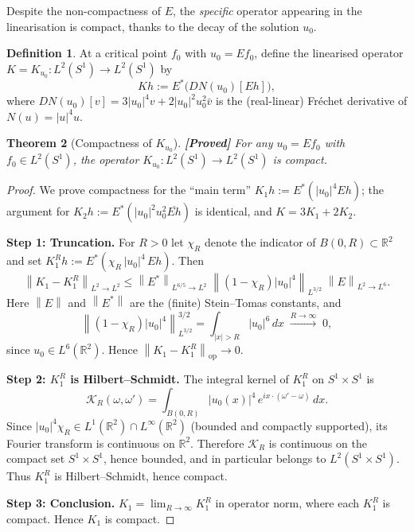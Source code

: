 \documentclass[12pt]{article}
\newtheorem{theorem}{Theorem}[section]
\theoremstyle{definition}
\newtheorem{definition}[theorem]{Definition}
\theoremstyle{remark}
\newcommand{\R}{\mathbb{R}}
\newcommand{\norm}[1]{\left\|#1\right\|}
\newcommand{\proven}{\textbf{\color{teal}[Proved]}}
\begin{document}
Despite the non-compactness of $E$, the \emph{specific} operator appearing
in the linearisation is compact, thanks to the decay of the solution $u_0$.

\begin{definition}
  At a critical point $f_0$ with $u_0=Ef_0$, define the linearised operator
  $K=K_{u_0}:L^2(S^1)\to L^2(S^1)$ by
  \[
    Kh := E^*\bigl(DN(u_0)[Eh]\bigr),
  \]
  where $DN(u_0)[v]=3|u_0|^4v+2|u_0|^2u_0^2\bar v$ is the (real-linear)
  Fr\'echet derivative of $N(u)=|u|^4u$.
\end{definition}

\begin{theorem}[Compactness of $K_{u_0}$]
  \label{thm:K-compact}
  \proven\quad
  For any $u_0=Ef_0$ with $f_0\in L^2(S^1)$, the operator
  $K_{u_0}:L^2(S^1)\to L^2(S^1)$ is compact.
\end{theorem}

\begin{proof}
  We prove compactness for the ``main term''
  $K_1 h:=E^*(|u_0|^4 Eh)$; the argument for
  $K_2 h:=E^*(|u_0|^2 u_0^2\overline{Eh})$ is identical,
  and $K=3K_1+2K_2$.

  \medskip\noindent
  \textbf{Step 1: Truncation.}
  For $R>0$ let $\chi_R$ denote the indicator of $B(0,R)\subset\R^2$ and
  set $K_1^R h:=E^*(\chi_R\,|u_0|^4\,Eh)$.  Then
  \[
    \norm{K_1-K_1^R}_{L^2\to L^2}
    \leq
    \norm{E^*}_{L^{6/5}\to L^2}
    \;\norm{(1-\chi_R)|u_0|^4}_{L^{3/2}}
    \;\norm{E}_{L^2\to L^6}.
  \]
  Here $\norm{E}$ and $\norm{E^*}$ are the (finite) Stein--Tomas constants,
  and
  \[
    \norm{(1-\chi_R)|u_0|^4}_{L^{3/2}}^{3/2}
    = \int_{|x|>R}|u_0|^6\,dx
    \;\xrightarrow{R\to\infty}\; 0,
  \]
  since $u_0\in L^6(\R^2)$.  Hence $\norm{K_1-K_1^R}_{\mathrm{op}}\to 0$.

  \medskip\noindent
  \textbf{Step 2: $K_1^R$ is Hilbert--Schmidt.}
  The integral kernel of $K_1^R$ on $S^1\times S^1$ is
  \[
    \mathcal K_R(\omega,\omega')
    = \int_{B(0,R)}|u_0(x)|^4\,e^{ix\cdot(\omega'-\omega)}\,dx.
  \]
  Since $|u_0|^4\chi_R\in L^1(\R^2)\cap L^\infty(\R^2)$ (bounded and
  compactly supported), its Fourier transform is continuous on $\R^2$.
  Therefore $\mathcal K_R$ is continuous on the compact set $S^1\times S^1$,
  hence bounded, and in particular belongs to $L^2(S^1\times S^1)$.
  Thus $K_1^R$ is Hilbert--Schmidt, hence compact.

  \medskip\noindent
  \textbf{Step 3: Conclusion.}
  $K_1=\lim_{R\to\infty}K_1^R$ in operator norm, where each $K_1^R$ is
  compact.  Hence $K_1$ is compact.
\end{proof}
\end{document}
